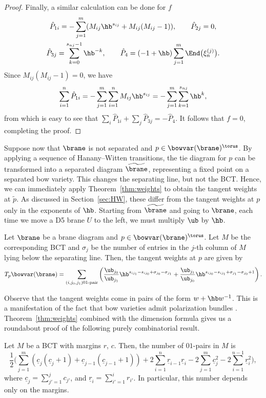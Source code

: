 \begin{proof}
Finally, a similar calculation can be done for $f$
\begin{gather*}
\hat{P}_{1i} = -\sum_{j=1}^m (M_{ij}\hb^{s_{ij}} + M_{ij}(M_{ij} - 1)), \qquad
\hat{P}_{2j} = 0, \\
\hat{P}_{3j} = \sum_{k=0}^{s_{nj}-1} \hb^{-k}, \qquad
\hat{P}_4 = (-1+\hb)\sum_{j=1}^m \End\bigl(\xi_n^{(j)}\bigr).
\end{gather*}
Since $M_{ij}(M_{ij} - 1) = 0$, we have
\[
\sum_{i=1}^n \hat{P}_{1i} = -\sum_{j=1}^m \sum_{i=1}^n M_{ij}\hb^{s_{ij}} = -\sum_{j=1}^m \sum_{k=1}^{s_{nj}} \hb^k,
\]
from which is easy to see that $\sum_i \hat{P}_{1i} + \sum_j \hat{P}_{3j} = -\hat{P}_4$. It follows that $f=0$, completing the proof.
\end{proof}

Suppose now that $\brane$ is not separated and $p\in\bowvar(\brane)^\torus$. By applying a sequence of Hanany--Witten transitions, the tie diagram for $p$ can be transformed into a separated diagram $\widetilde\brane$, representing a fixed point  on a separated bow variety. This changes the separating line, but not the BCT. Hence, we can immediately apply Theorem~\ref{thm:weights} to obtain the tangent weights at $\widetilde p$. As discussed in Section~\ref{sec:HW}, these differ from the tangent weights at $p$ only in the exponents of $\hb$. Starting from $\widetilde\brane$ and going to $\brane$, each time we move a D5 brane $U$ to the left, we must multiply $\ub$ by $\hb$.

\begin{Corollary} \label{cor:weights}
Let $\brane$ be a brane diagram and $p\in\bowvar(\brane)^\torus$. Let $M$ be the corresponding BCT and $\sigma_j$ be the number of entries in the $j$-th column of $M$ lying below the separating line. Then, the tangent weights at $p$ are given by
\[
T_p\bowvar(\brane) = \sum_{(i, j_0, j_1)\text{\rm 01-pair}} \left(
 \frac{\ub_{j_0}}{\ub_{j_1}}\hb^{s_{ij_1}-s_{ij_0} + \sigma_{j_0}-\sigma_{j_1}} + \frac{\ub_{j_1}}{\ub_{j_0}}\hb^{s_{ij_0}-s_{ij_1} + \sigma_{j_1}-\sigma_{j_0} +1} \right).
\]
\end{Corollary}

Observe that the tangent weights come in pairs of the form $w+\hb w^{-1}$. This is a manifestation of the fact that bow varieties admit polarization bundles \cite[Section~4.4.2]{S}. Theorem~\ref{thm:weights} combined with the dimension formula \cite[equation~(4)]{RS} gives us a roundabout proof of the following purely combinatorial result.
\begin{Corollary}
Let $M$ be a BCT with margins $r$, $c$. Then, the number of $01$-pairs in $M$ is
\[
\frac{1}{2}\Biggl(
\sum_{j=1}^m ( \underline c_j(\underline c_j + 1) + \underline c_{j-1}(\underline c_{j-1} + 1) )
+ 2\sum_{i=1}^n \underline r_{i-1}\underline r_i
-2\sum_{j=1}^m \underline c_j^2 -2\sum_{i=1}^{n-1} \underline r_i^2
\Biggr),
\]
where $\underline c_j=\sum_{j'=1}^j c_{j'}$, and $\underline r_i=\sum_{i'=1}^i r_{i'}$. In particular, this number depends only on the margins.
\end{Corollary}


